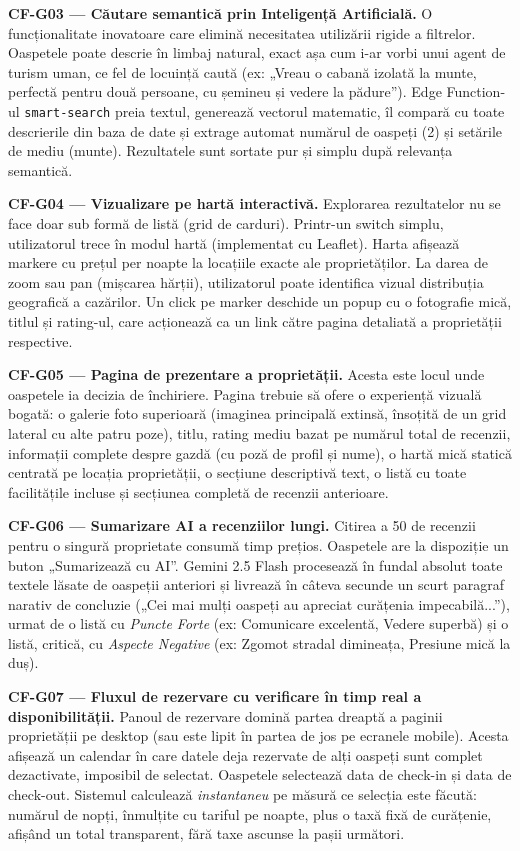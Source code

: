 \documentclass[12pt,a4paper,oneside]{report}
\begin{document}
\textbf{CF-G03 — Căutare semantică prin Inteligență Artificială.} O funcționalitate inovatoare care elimină necesitatea utilizării rigide a filtrelor. Oaspetele poate descrie în limbaj natural, exact așa cum i-ar vorbi unui agent de turism uman, ce fel de locuință caută (ex: „Vreau o cabană izolată la munte, perfectă pentru două persoane, cu șemineu și vedere la pădure''). Edge Function-ul \texttt{smart-search} preia textul, generează vectorul matematic, îl compară cu toate descrierile din baza de date și extrage automat numărul de oaspeți (2) și setările de mediu (munte). Rezultatele sunt sortate pur și simplu după relevanța semantică.

\textbf{CF-G04 — Vizualizare pe hartă interactivă.} Explorarea rezultatelor nu se face doar sub formă de listă (grid de carduri). Printr-un switch simplu, utilizatorul trece în modul hartă (implementat cu Leaflet). Harta afișează markere cu prețul per noapte la locațiile exacte ale proprietăților. La darea de zoom sau pan (mișcarea hărții), utilizatorul poate identifica vizual distribuția geografică a cazărilor. Un click pe marker deschide un popup cu o fotografie mică, titlul și rating-ul, care acționează ca un link către pagina detaliată a proprietății respective.

\textbf{CF-G05 — Pagina de prezentare a proprietății.} Acesta este locul unde oaspetele ia decizia de închiriere. Pagina trebuie să ofere o experiență vizuală bogată: o galerie foto superioară (imaginea principală extinsă, însoțită de un grid lateral cu alte patru poze), titlu, rating mediu bazat pe numărul total de recenzii, informații complete despre gazdă (cu poză de profil și nume), o hartă mică statică centrată pe locația proprietății, o secțiune descriptivă text, o listă cu toate facilitățile incluse și secțiunea completă de recenzii anterioare.

\textbf{CF-G06 — Sumarizare AI a recenziilor lungi.} Citirea a 50 de recenzii pentru o singură proprietate consumă timp prețios. Oaspetele are la dispoziție un buton „Sumarizează cu AI''. Gemini 2.5 Flash procesează în fundal absolut toate textele lăsate de oaspeții anteriori și livrează în câteva secunde un scurt paragraf narativ de concluzie („Cei mai mulți oaspeți au apreciat curățenia impecabilă...''), urmat de o listă cu \textit{Puncte Forte} (ex: Comunicare excelentă, Vedere superbă) și o listă, critică, cu \textit{Aspecte Negative} (ex: Zgomot stradal dimineața, Presiune mică la duș).

\textbf{CF-G07 — Fluxul de rezervare cu verificare în timp real a disponibilității.} Panoul de rezervare domină partea dreaptă a paginii proprietății pe desktop (sau este lipit în partea de jos pe ecranele mobile). Acesta afișează un calendar în care datele deja rezervate de alți oaspeți sunt complet dezactivate, imposibil de selectat. Oaspetele selectează data de check-in și data de check-out. Sistemul calculează \textit{instantaneu} pe măsură ce selecția este făcută: numărul de nopți, înmulțite cu tariful pe noapte, plus o taxă fixă de curățenie, afișând un total transparent, fără taxe ascunse la pașii următori.
\end{document}
